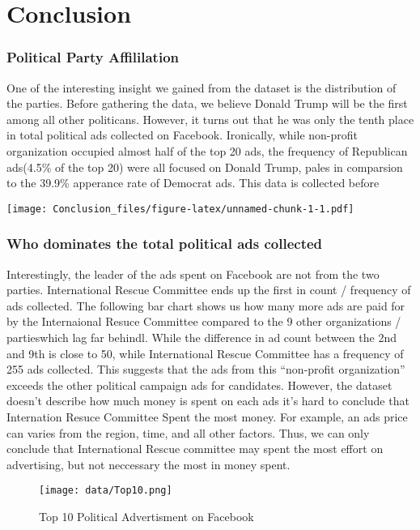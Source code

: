 \documentclass[]{article}
\author{}
\date{\vspace{-2.5em}}
\begin{document}
\hypertarget{conclusion}{%
\section{Conclusion}\label{conclusion}}

\hypertarget{political-party-affililation}{%
\subsubsection{Political Party
Affililation}\label{political-party-affililation}}

One of the interesting insight we gained from the dataset is the
distribution of the parties. Before gathering the data, we believe
Donald Trump will be the first among all other politicans. However, it
turns out that he was only the tenth place in total political ads
collected on Facebook. Ironically, while non-profit organization
occupied almost half of the top 20 ads, the frequency of Republican
ads(4.5\% of the top 20) were all focused on Donald Trump, pales in
comparsion to the 39.9\% apperance rate of Democrat ads. This data is
collected before

\texttt{[image: Conclusion\_files/figure-latex/unnamed-chunk-1-1.pdf]}

\hypertarget{who-dominates-the-total-political-ads-collected}{%
\subsubsection{Who dominates the total political ads
collected}\label{who-dominates-the-total-political-ads-collected}}

Interestingly, the leader of the ads spent on Facebook are not from the
two parties. International Rescue Committee ends up the first in count /
frequency of ads collected. The following bar chart shows us how many
more ads are paid for by the Internaional Resuce Committee compared to
the 9 other organizations / partieswhich lag far behindl. While the
difference in ad count between the 2nd and 9th is close to 50, while
International Rescue Committee has a frequency of 255 ads collected.
This suggests that the ads from this ``non-profit organization'' exceeds
the other political campaign ads for candidates. However, the dataset
doesn't describe how much money is spent on each ads it's hard to
conclude that Internation Resuce Committee Spent the most money. For
example, an ads price can varies from the region, time, and all other
factors. Thus, we can only conclude that International Rescue committee
may spent the most effort on advertising, but not neccessary the most in
money spent.

\begin{figure}
\centering
\texttt{[image: data/Top10.png]}
\caption{Top 10 Political Advertisment on Facebook}
\end{figure}
\end{document}
